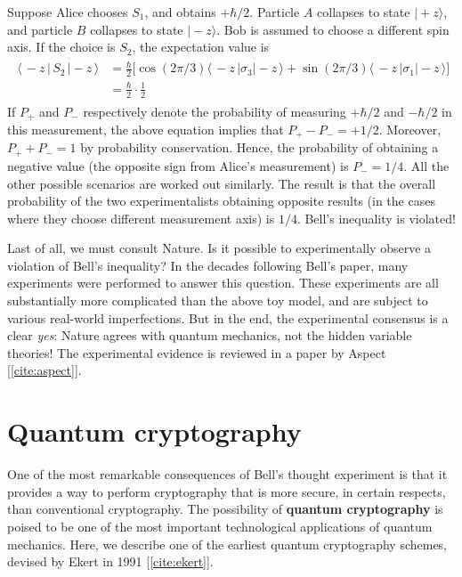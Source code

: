 \documentclass[pra,12pt]{revtex4-2}
\begin{document}
Suppose Alice chooses $S_1$, and obtains $+\hbar/2$.  Particle $A$
collapses to state $|\!+\!z\rangle$, and particle $B$ collapses to
state $|\!-\!z\rangle$.  Bob is assumed to choose a different spin
axis.  If the choice is $S_2$, the expectation value is
\begin{align}
  \begin{aligned}\langle\, - z \, | \, S_2 \,|-\!z\,\rangle &= \frac{\hbar}{2} \Big[\cos(2\pi/3) \langle\,- z\,|\sigma_3| - \!z\,\rangle + \sin(2\pi/3)\langle\,- z\,|\sigma_1|-\!z\,\rangle\Big]\\ &= \frac{\hbar}{2} \cdot \frac{1}{2} \end{aligned}
\end{align}
If $P_+$ and $P_-$ respectively denote the probability of measuring
$+\hbar/2$ and $-\hbar/2$ in this measurement, the above equation
implies that $P_+ - P_- = + 1/2$.  Moreover, $P_+ + P_- = 1$ by
probability conservation.  Hence, the probability of obtaining a
negative value (the opposite sign from Alice's measurement) is $P_- =
1/4$.  All the other possible scenarios are worked out similarly.  The
result is that the overall probability of the two experimentalists
obtaining opposite results (in the cases where they choose different
measurement axis) is $1/4$.  Bell's inequality is violated!

Last of all, we must consult Nature.  Is it possible to experimentally
observe a violation of Bell's inequality?  In the decades following
Bell's paper, many experiments were performed to answer this question.
These experiments are all substantially more complicated than the
above toy model, and are subject to various real-world imperfections.
But in the end, the experimental consensus is a clear \textit{yes}:
Nature agrees with quantum mechanics, not the hidden variable
theories!  The experimental evidence is reviewed in a paper by Aspect
[\ref{cite:aspect}].

\section{Quantum cryptography}

One of the most remarkable consequences of Bell's thought experiment
is that it provides a way to perform cryptography that is more secure,
in certain respects, than conventional cryptography.  The possibility
of \textbf{quantum cryptography} is poised to be one of the most
important technological applications of quantum mechanics.  Here, we
describe one of the earliest quantum cryptography schemes, devised by
Ekert in 1991 [\ref{cite:ekert}].
\end{document}
